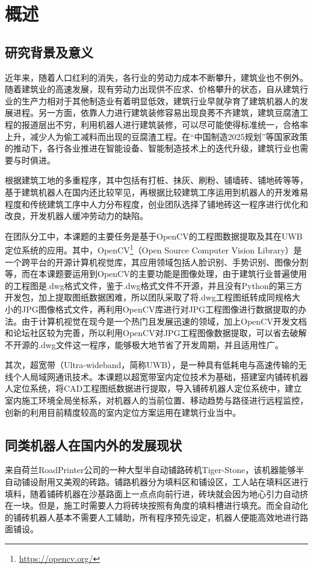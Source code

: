 \section{概述}

\subsection{研究背景及意义}

近年来，随着人口红利的消失，各行业的劳动力成本不断攀升，建筑业也不例外。随着建筑业的高速发展，现有劳动力出现供不应求、价格攀升的状态，自从建筑行业的生产力相对于其他制造业有着明显低效，建筑行业早就孕育了建筑机器人的发展进程。另一方面，依靠人力进行建筑装修容易出现良莠不齐建筑，建筑豆腐渣工程的报道层出不穷，利用机器人进行建筑装修，可以尽可能使得标准统一，合格率上升，减少人为偷工减料而出现的豆腐渣工程。在“中国制造2025规划”等国家政策的推动下，各行各业推进在智能设备、智能制造技术上的迭代升级，建筑行业也需要与时俱进。

根据建筑工地的多重程序，其中包括有打桩、抹灰、刷粉、铺墙砖、铺地砖等等，基于建筑机器人在国内还比较罕见，再根据比较建筑工序运用到机器人的开发难易程度和传统建筑工序中人力分布程度，创业团队选择了铺地砖这一程序进行优化和改良，开发机器人缓冲劳动力的缺陷。

在团队分工中，本课题的主要任务是基于OpenCV的工程图数据提取及其在UWB定位系统的应用。其中，OpenCV\footnote{\url{https://opencv.org/}}（Open Source Computer Vision Library）是一个跨平台的开源计算机视觉库，其应用领域包括人脸识别、手势识别、图像分割等，而在本课题要运用到OpenCV的主要功能是图像处理，由于建筑行业普遍使用的工程图是.dwg格式文件，鉴于.dwg格式文件不开源，并且没有Python的第三方开发包，加上提取图纸数据困难，所以团队采取了将.dwg工程图纸转成同规格大小的JPG图像格式文件，再利用OpenCV库进行对JPG工程图像进行数据提取的办法。由于计算机视觉在现今是一个热门且发展迅速的领域，加上OpenCV开发文档和论坛社区较为完善，所以利用OpenCV对JPG工程图像数据提取，可以省去破解不开源的.dwg文件这一程序，能够极大地节省了开发周期，并且适用性广。

其次，超宽带（Ultra-wideband，简称UWB），是一种具有低耗电与高速传输的无线个人局域网通讯技术。本课题以超宽带室内定位技术为基础，搭建室内铺砖机器人定位系统，将CAD工程图纸数据进行提取，导入铺砖机器人定位系统中，建立室内施工环境全局坐标系，对机器人的当前位置、移动趋势与路径进行远程监控，创新的利用目前精度较高的室内定位方案运用在建筑行业当中。


\subsection{同类机器人在国内外的发展现状}
来自荷兰RoadPrinter公司的一种大型半自动铺路砖机Tiger-Stone，该机器能够半自动铺设耐用又美观的砖路。铺路机器分为填料区和铺设区，工人站在填料区进行填料，随着铺砖机器在沙基路面上一点点向前行进，砖块就会因为地心引力自动挤在一块。但是，施工时需要人力将砖块按照有角度的填料槽进行填充。而全自动化的铺砖机器人基本不需要人工辅助，所有程序预先设定，机器人便能高效地进行路面铺设。

